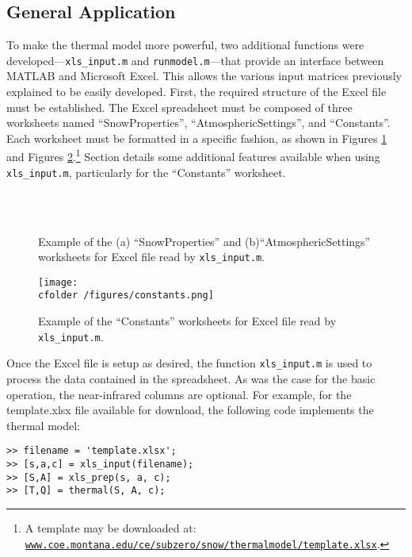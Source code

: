 \subsection{General Application}
To make the thermal model more powerful, two additional functions were developed---\texttt{xls\_input.m} and \texttt{runmodel.m}---that provide an interface between MATLAB and Microsoft Excel. This allows the various input matrices previously explained to be easily developed. First, the required structure of the Excel file must be established.  The Excel spreadsheet must be composed of three worksheets named ``SnowProperties'', ``AtmosphericSettings'', and ``Constants''.  Each worksheet must be formatted in a specific fashion, as shown in Figures \ref{TM:fig:snowatm} and Figures \ref{TM:fig:constants}.\footnote{A template may be downloaded at: \href{http://www.coe.montana.edu/ce/subzero/snow/thermalmodel/template.xlsx}{\nolinkurl{www.coe.montana.edu/ce/subzero/snow/thermalmodel/template.xlsx}}.}  Section  details some additional features available when using \texttt{xls\_input.m}, particularly for the ``Constants'' worksheet.  

\begin{figure}[ht!]\centering
{}\\
\\
\caption{Example of the (a) ``SnowProperties'' and  (b)``AtmosphericSettings'' worksheets for Excel file read by \texttt{xls\_input.m}.}
\label{TM:fig:snowatm}
\end{figure}

\begin{figure}[b!]\centering
\texttt{[image: \\cfolder /figures/constants.png]}
\caption{Example of the ``Constants'' worksheets for Excel file read by \texttt{xls\_input.m}.}
\label{TM:fig:constants}
\end{figure}

Once the Excel file is setup as desired, the function \texttt{xls\_input.m} is used to process the data contained in the spreadsheet. As was the case for the basic operation, the near-infrared columns are optional.  For example, for the template.xlsx file available for download, the following code implements the thermal model:
\begin{singlespaced}\begin{lstlisting}[style=inline]
>> filename = 'template.xlsx';
>> [s,a,c] = xls_input(filename);
>> [S,A] = xls_prep(s, a, c);
>> [T,Q] = thermal(S, A, c); 
\end{lstlisting}\end{singlespaced}

